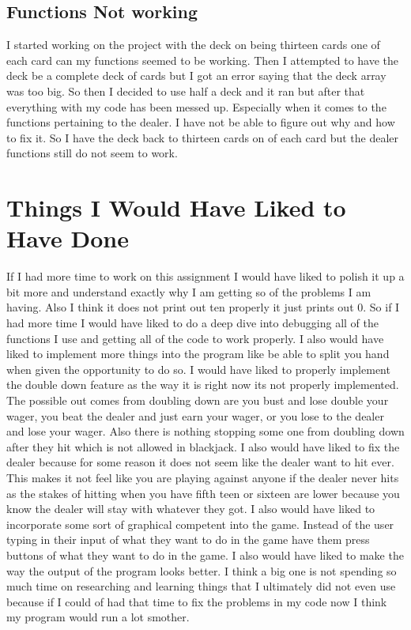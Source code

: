 \documentclass[twoside]{article}
\begin{document}
\subsection{Functions Not working}
I started working on the project with the deck on being thirteen cards one of each card can my functions seemed to be working. Then I attempted to have the deck be a complete deck of cards but I got an error saying that the deck array was too big. So then I decided to use half a deck and it ran but after that everything with my code has been messed up. Especially when it comes to the functions pertaining to the dealer. I have not be able to figure out why and how to fix it. So I have the deck back to thirteen cards on of each card but the dealer functions still do not seem to work.

\section{Things I Would Have Liked to Have Done}
If I had more time to work on this assignment I would have liked to polish it up a bit more and understand exactly why I am getting so of the problems I am having. Also I think it does not print out ten properly it just prints out 0. So if I had more time I would have liked to do a deep dive into debugging all of the functions I use and getting all of the code to work properly. I also would have liked to implement more things into the program like be able to split you hand when given the opportunity to do so. I would have liked to properly implement the double down feature as the way it is right now its not properly implemented. The possible out comes from doubling down are you bust and lose double your wager, you beat the dealer and just earn your wager, or you lose to the dealer and lose your wager. Also there is nothing stopping some one from doubling down after they hit which is not allowed in blackjack. I also would have liked to fix the dealer because for some reason it does not seem like the dealer want to hit ever. This makes it not feel like you are playing against anyone if the dealer never hits as the stakes of hitting when you have fifth teen or sixteen are lower because you know the dealer will stay with whatever they got. I also would have liked to incorporate some sort of graphical competent into the game. Instead of the user typing in their input of what they want to do in the game have them press buttons of what they want to do in the game. I also would have liked to make the way the output of the program looks better. I think a big one is not spending so much time on researching and learning things that I ultimately did not even use because if I could of had that time to fix the problems in my code now I think my program would run a lot smother.
\end{document}
